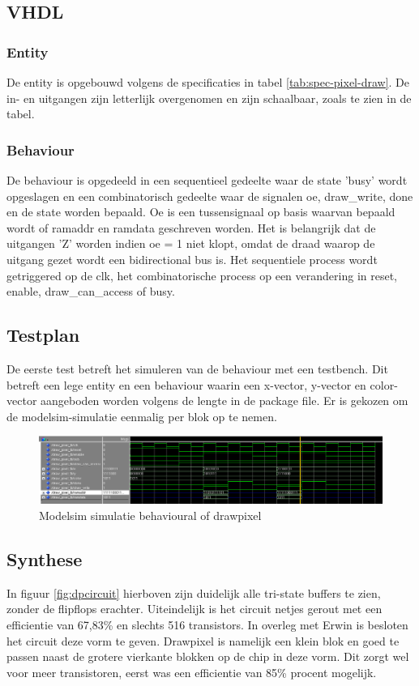 \documentclass{scrartcl} %
\begin{document}
\subsection{VHDL}
\label{ssec:vhdl_dp}
\subsubsection{Entity}
De entity is opgebouwd volgens de specificaties in tabel \ref{tab:spec-pixel-draw}. De in- en uitgangen zijn letterlijk overgenomen en zijn schaalbaar, zoals te zien in de tabel. 

\subsubsection{Behaviour}
De behaviour is opgedeeld in een sequentieel gedeelte waar de state 'busy' wordt opgeslagen en een combinatorisch gedeelte waar de signalen oe, draw\_write, done en de state worden bepaald. Oe is een tussensignaal op basis waarvan bepaald wordt of ramaddr en ramdata geschreven worden. Het is belangrijk dat de uitgangen 'Z' worden indien oe = 1 niet klopt, omdat de draad waarop de uitgang gezet wordt een bidirectional bus is. Het sequentiele process wordt getriggered op de clk, het combinatorische process op een verandering in reset, enable, draw\_can\_access of busy. 

\subsection{Testplan}
De eerste test betreft het simuleren van de behaviour met een testbench. Dit betreft een lege entity en een behaviour waarin een x-vector, y-vector en color-vector aangeboden worden volgens de lengte in de package file. Er is gekozen om de modelsim-simulatie eenmalig per blok op te nemen. 
\begin{figure} [h!]
\centering
\includegraphics [scale = 0.8] {resource/dp_sim}
\caption{Modelsim simulatie behavioural of drawpixel}
\label{fig:dp_sim}
\end{figure}

\subsection{Synthese}
In figuur \ref{fig:dpcircuit} hierboven zijn duidelijk alle tri-state buffers te zien, zonder de flipflops erachter. Uiteindelijk is het circuit netjes gerout met een efficientie van 67,83\% en slechts 516 transistors. In overleg met Erwin is besloten het circuit deze vorm te geven. Drawpixel is namelijk een klein blok en goed te passen naast de grotere vierkante blokken op de chip in deze vorm. Dit zorgt wel voor meer transistoren, eerst was een efficientie van 85\% procent mogelijk. 
\end{document}
